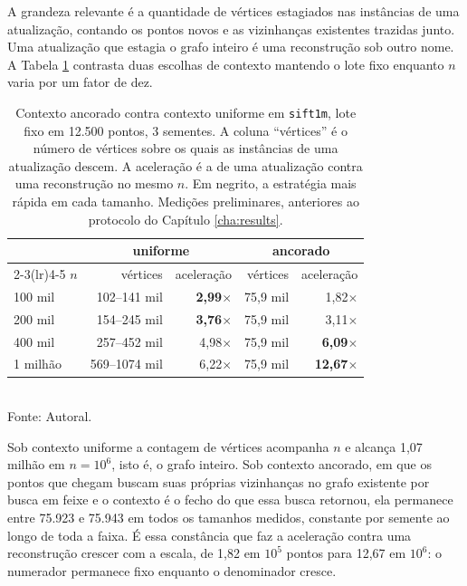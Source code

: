 A grandeza relevante é a quantidade de vértices estagiados nas instâncias de uma atualização, contando os pontos novos e as vizinhanças existentes trazidas junto. Uma atualização que estagia o grafo inteiro é uma reconstrução sob outro nome. A Tabela \ref{tab:strategy} contrasta duas escolhas de contexto mantendo o lote fixo enquanto $n$ varia por um fator de dez.\\

\begin{table}[htb!]
\caption{\label{tab:strategy} Contexto ancorado contra contexto uniforme em \texttt{sift1m}, lote fixo em 12.500 pontos, 3 sementes. A coluna ``vértices'' é o número de vértices sobre os quais as instâncias de uma atualização descem. A aceleração é a de uma atualização contra uma reconstrução no mesmo $n$. Em negrito, a estratégia mais rápida em cada tamanho. Medições preliminares, anteriores ao protocolo do Capítulo \ref{cha:results}.}
\centering
\footnotesize
\begin{tabular}{@{}lrrrr@{}}
\toprule
 & \multicolumn{2}{c}{uniforme} & \multicolumn{2}{c}{ancorado} \\
\cmidrule(lr){2-3}\cmidrule(lr){4-5}
$n$ & vértices & aceleração & vértices & aceleração \\
\midrule
100 mil  & 102--141 mil  & \textbf{2,99}$\times$ & 75,9 mil & 1,82$\times$ \\
200 mil  & 154--245 mil  & \textbf{3,76}$\times$ & 75,9 mil & 3,11$\times$ \\
400 mil  & 257--452 mil  & 4,98$\times$ & 75,9 mil & \textbf{6,09}$\times$ \\
1 milhão & 569--1074 mil & 6,22$\times$ & 75,9 mil & \textbf{12,67}$\times$ \\
\bottomrule
\end{tabular}\\
Fonte: Autoral.
\end{table}

Sob contexto uniforme a contagem de vértices acompanha $n$ e alcança 1,07 milhão em $n = 10^6$, isto é, o grafo inteiro. Sob contexto ancorado, em que os pontos que chegam buscam suas próprias vizinhanças no grafo existente por busca em feixe e o contexto é o fecho do que essa busca retornou, ela permanece entre 75.923 e 75.943 em todos os tamanhos medidos, constante por semente ao longo de toda a faixa. É essa constância que faz a aceleração contra uma reconstrução crescer com a escala, de 1,82 em $10^5$ pontos para 12,67 em $10^6$: o numerador permanece fixo enquanto o denominador cresce.\\


